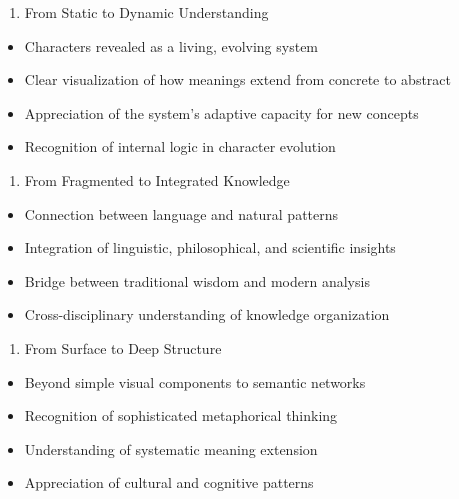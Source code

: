 \documentclass[11pt,letterpaper]{article}
\begin{document}
\begin{enumerate}
\def\labelenumi{\arabic{enumi}.}
\setcounter{enumi}{1}
\tightlist
\item
  From Static to Dynamic Understanding
\end{enumerate}

\begin{itemize}
\tightlist
\item
  Characters revealed as a living, evolving system
\item
  Clear visualization of how meanings extend from concrete to abstract
\item
  Appreciation of the system's adaptive capacity for new concepts
\item
  Recognition of internal logic in character evolution
\end{itemize}

\begin{enumerate}
\def\labelenumi{\arabic{enumi}.}
\setcounter{enumi}{2}
\tightlist
\item
  From Fragmented to Integrated Knowledge
\end{enumerate}

\begin{itemize}
\tightlist
\item
  Connection between language and natural patterns
\item
  Integration of linguistic, philosophical, and scientific insights
\item
  Bridge between traditional wisdom and modern analysis
\item
  Cross-disciplinary understanding of knowledge organization
\end{itemize}

\begin{enumerate}
\def\labelenumi{\arabic{enumi}.}
\setcounter{enumi}{3}
\tightlist
\item
  From Surface to Deep Structure
\end{enumerate}

\begin{itemize}
\tightlist
\item
  Beyond simple visual components to semantic networks
\item
  Recognition of sophisticated metaphorical thinking
\item
  Understanding of systematic meaning extension
\item
  Appreciation of cultural and cognitive patterns
\end{itemize}
\end{document}
